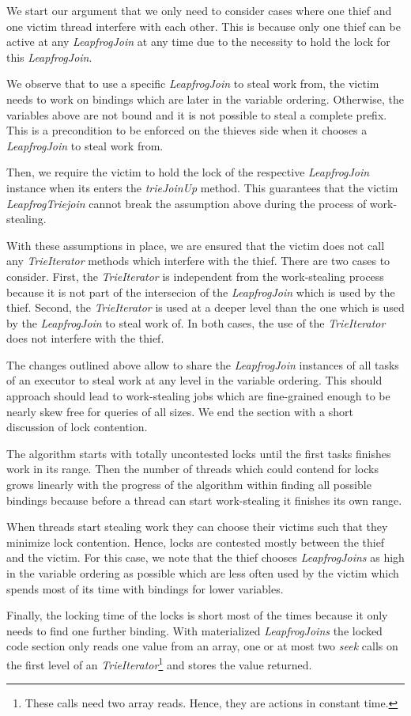 We start our argument that we only need to consider cases where one thief and one victim
thread interfere with each other.
This is because only one thief can be active at any \textit{LeapfrogJoin} at any time due to the
necessity to hold the lock for this \textit{LeapfrogJoin}.

We observe that to use a specific \textit{LeapfrogJoin} to steal work from, the
victim needs to work on bindings which are later in the variable ordering.
Otherwise, the variables above are not bound and it is not possible to steal a complete prefix.
This is a precondition to be enforced on the thieves side when it chooses a \textit{LeapfrogJoin}
to steal work from.

Then, we require the victim to hold the lock of the respective \textit{LeapfrogJoin}
instance when its enters the \textit{trieJoinUp} method.
This guarantees that the victim \textit{LeapfrogTriejoin} cannot break the assumption above during the process
of work-stealing.

With these assumptions in place, we are ensured that the victim does not call
any \textit{TrieIterator} methods which interfere with the thief.
There are two cases to consider.
First, the \textit{TrieIterator} is independent from the work-stealing process because it is not
part of the intersecion of the \textit{LeapfrogJoin} which is used by the thief.
Second, the \textit{TrieIterator} is used at a deeper level than the one which is used by the
\textit{LeapfrogJoin} to steal work of.
In both cases, the use of the \textit{TrieIterator} does not interfere with the thief.

The changes outlined above allow to share the \textit{LeapfrogJoin} instances of all
tasks of an executor to steal work at any level in the variable ordering.
This should approach should lead to work-stealing jobs which are fine-grained enough
to be nearly skew free for queries of all sizes.
We end the section with a short discussion of lock contention.

The algorithm starts with totally uncontested locks until the first tasks finishes work in its
range.
Then the number of threads which could contend for locks grows linearly with the progress of the
algorithm within finding all possible bindings because before a thread can start work-stealing it
finishes its own range.

When threads start stealing work they can choose their victims such that they minimize lock contention.
Hence, locks are contested mostly between the thief and the victim.
For this case, we note that the thief chooses \textit{LeapfrogJoins} as high in the variable ordering
as possible which are less often used by the victim which spends most of its time with bindings
for lower variables.

Finally, the locking time of the locks is short most of the times because it only needs to find
one further binding.
With materialized \textit{LeapfrogJoins} the locked code section only
reads one value from an array, one or at most two \textit{seek} calls on the first level of an
\textit{TrieIterator}\footnote{These calls need two array reads. Hence, they are actions in constant time.} and stores the value returned.
